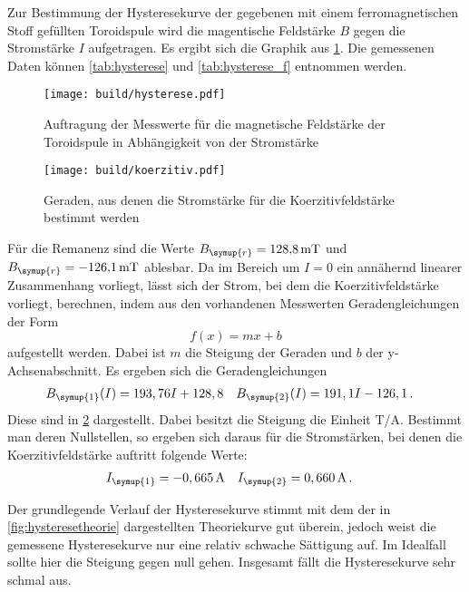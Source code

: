 Zur Bestimmung der Hysteresekurve der gegebenen mit einem ferromagnetischen Stoff
gefüllten Toroidspule wird die magentische Feldstärke $B$ gegen die Stromstärke
$I$ aufgetragen. Es ergibt sich die Graphik aus \ref{fig:hysterese}. Die gemessenen
Daten können \ref{tab:hysterese} und \ref{tab:hysterese_f}  entnommen werden.

\begin{figure}
  \centering
  \texttt{[image: build/hysterese.pdf]}
  \caption{Auftragung der Messwerte für die magnetische Feldstärke der Toroidspule
  in Abhängigkeit von der Stromstärke}
  \label{fig:hysterese}
\end{figure}

\begin{figure}
  \centering
  \texttt{[image: build/koerzitiv.pdf]}
  \caption{Geraden, aus denen die Stromstärke für die Koerzitivfeldstärke bestimmt werden}
  \label{fig:koerzitiv}
\end{figure}


Für die Remanenz sind die Werte $B_{\symup{r}} = \SI{128,8}{\milli\tesla}$ und $B_{\symup{r}}=\SI{-126,1}{\milli\tesla}$
ablesbar. Da im Bereich um $I=0$ ein annähernd linearer Zusammenhang vorliegt, lässt
sich der Strom, bei dem die Koerzitivfeldstärke vorliegt, berechnen, indem aus den vorhandenen
Messwerten Geradengleichungen der Form
\begin{equation}
  f(x)=mx+b
  \end{equation}
aufgestellt werden. Dabei ist $m$ die Steigung der Geraden und $b$ der y-Achsenabschnitt.
Es ergeben sich die Geradengleichungen
\begin{align}
  B_{\symup{1}}(I)&=193,76I+128,8 & B_{\symup{2}}(I)&=191,1I-126,1\,.
\end{align}
Diese sind in \ref{fig:koerzitiv} dargestellt. Dabei besitzt die Steigung die Einheit
T/A.
Bestimmt man deren Nullstellen, so ergeben sich daraus für die Stromstärken, bei
denen die Koerzitivfeldstärke auftritt folgende Werte:
\begin{align}
  I_{\symup{1}}&=-0,665\,\text{A} & I_{\symup{2}}&=0,660\,\text{A}\,.
\end{align}


Der grundlegende Verlauf der Hysteresekurve stimmt mit dem der in \ref{fig:hysteresetheorie}
dargestellten Theoriekurve gut überein, jedoch weist
die gemessene Hysteresekurve nur eine relativ schwache Sättigung auf. Im Idealfall sollte
hier die Steigung gegen null gehen. Insgesamt fällt die Hysteresekurve sehr schmal aus.

